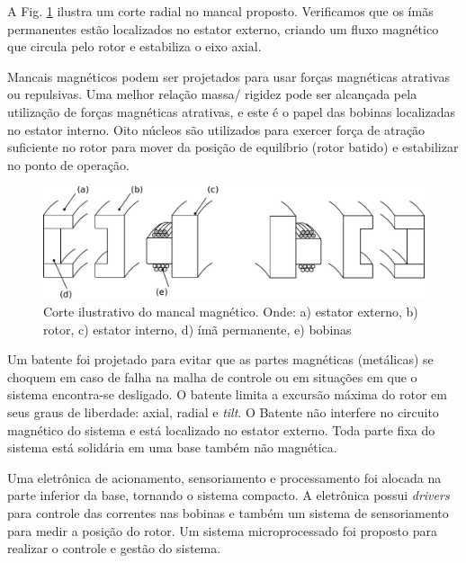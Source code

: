 A Fig. \ref{fig:mancal:corte} ilustra um corte radial no mancal proposto. Verificamos que os ímãs permanentes estão localizados no estator externo, criando um fluxo magnético que circula pelo rotor e estabiliza o eixo axial.

Mancais magnéticos podem ser projetados para usar forças magnéticas atrativas ou repulsivas. Uma melhor relação massa/ rigidez pode ser alcançada pela utilização de forças magnéticas atrativas, e este é o papel das bobinas localizadas no estator interno. Oito núcleos são utilizados para exercer força de atração suficiente no rotor para mover da posição de equilíbrio (rotor batido) e estabilizar no ponto de operação. 

\begin{figure}[ht!]
	\centering
	\includegraphics[width=1\linewidth]{./Figs/mancais/mancal_corte}
	\caption[Corte ilustrativo do mancal magnético]{Corte ilustrativo do mancal magnético. Onde: a) estator externo, b) rotor, c) estator interno, d) ímã permanente, e) bobinas}
	\label{fig:mancal:corte}
\end{figure}

Um batente foi projetado para evitar que as partes magnéticas (metálicas) se choquem em caso de falha na malha de controle ou em situações em que o sistema encontra-se desligado. O batente limita a excursão máxima do rotor em seus graus de liberdade: axial, radial e \textit{tilt}. O Batente não interfere no circuito magnético do sistema e está localizado no estator externo. Toda parte fixa do sistema está solidária em uma base também não magnética.

Uma eletrônica de acionamento, sensoriamento e processamento foi alocada na parte inferior da base, tornando o sistema compacto. A eletrônica possui \textit{drivers} para controle das correntes nas bobinas e também um sistema de sensoriamento para medir a posição do rotor. Um sistema microprocessado foi proposto para realizar o controle e gestão do sistema.

%

